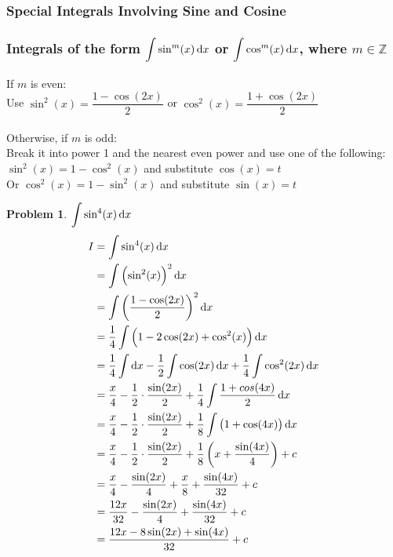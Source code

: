 \documentclass[14]{article}
\theoremstyle{definition}
\newtheorem{prob}{Problem}
\theoremstyle{case}
\begin{document}
\subsubsection{Special Integrals Involving Sine and Cosine}
\subsubsection*{Integrals of the form $\displaystyle\int \sin^m(x) \dif x$ or $\displaystyle \int \cos^m (x) \dif x$, where $m \in \mathbb{Z}$}
If $m$ is even:\\
\indent\indent Use $\sin^2(x) = \dfrac{1-\cos(2x)}{2}$ or $\cos^2(x) = \dfrac{1 + \cos(2x)}{2}$\\\\
Otherwise, if $m$ is odd:\\
\indent\indent Break it into power 1 and the nearest even power and use one of the following:\\
\indent\indent\indent\indent $\sin^2(x) = 1-\cos^2(x)$ and substitute $\cos(x) = t$\\
\indent\indent\indent\indent Or $\cos^2(x) = 1-\sin^2(x)$ and substitute $\sin(x) = t$
\begin{prob}
$\displaystyle \int \sin^4(x) \dif x$
\begin{align*}
I &= \int \sin^4(x) \dif x\\
&= \int \left( \sin^2(x) \right)^2 \dif x\\
&= \int \left( \dfrac{1-\cos(2x)}{2} \right)^2 \dif x\\
&= \dfrac14 \int \left( 1 - 2\cos(2x) + \cos^2(x) \right)\dif x\\
&= \dfrac14\int \dif x - \dfrac12 \int\cos(2x) \dif x + \dfrac14 \int \cos^2(2x) \dif x\\
&= \dfrac{x}{4} - \dfrac12 \cdot \dfrac{\sin(2x)}2 + \dfrac14 \int \dfrac{1 + cos(4x)}{2} \dif x\\
&=\dfrac{x}{4} - \dfrac12 \cdot \dfrac{\sin(2x)}2 + \dfrac18 \displaystyle \int \left(1 + \cos(4x)\right) \dif x\\
&=\dfrac{x}{4} - \dfrac12 \cdot \dfrac{\sin(2x)}2 + \dfrac18 \left( x + \dfrac{\sin(4x)}{4} \right) + c\\
&= \dfrac{x}4 - \dfrac{\sin(2x)}{4} + \dfrac{x}8 + \dfrac{\sin(4x)}{32} + c\\
&= \dfrac{12x}{32} - \dfrac{\sin(2x)}{4}+ \dfrac{\sin(4x)}{32} + c\\
&= \dfrac{12x - 8\sin(2x) + \sin(4x)}{32} + c
\end{align*}
\end{prob}
\end{document}
